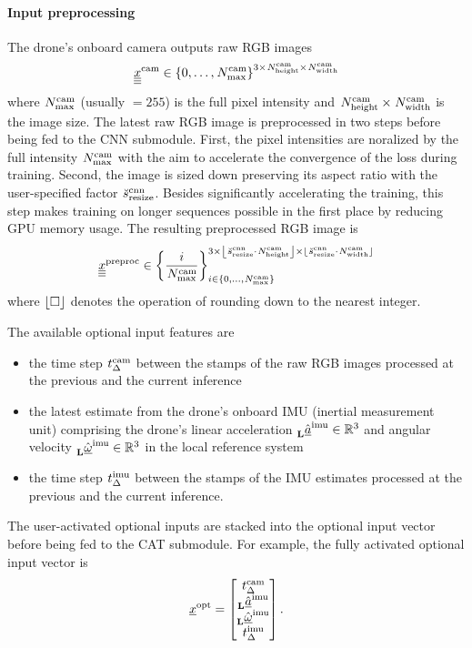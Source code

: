 \paragraph*{Input preprocessing} ${}$\\
The drone's onboard camera 
outputs raw RGB images
\begin{equation}
    {}_{}^{} {\underline{\underline{\underline x}}}^{\text{cam}}_{} \in \left\{ 0, \dots, {}_{}^{} {N}^{\text{cam}}_{\text{max}} \right\}^{
        3 \times {}_{}^{} {N}^{\text{cam}}_{\text{height}} \times {}_{}^{} {N}^{\text{cam}}_{\text{width}}}
\end{equation}
where 
${}_{}^{} {N}^{\text{cam}}_{\text{max}}$ (usually $= 255$) is the full pixel intensity 
and
${}_{}^{} {N}^{\text{cam}}_{\text{height}} \times {}_{}^{} {N}^{\text{cam}}_{\text{width}}$
is the image size.
The latest raw RGB image is preprocessed in two steps
before being fed to the CNN submodule.
First, the pixel intensities are noralized by the full intensity 
${}_{}^{} {N}^{\text{cam}}_{\text{max}}$ with the aim
to accelerate the convergence of the loss during training.
Second, the image is sized down 
preserving its aspect ratio
with the user-specified factor ${}_{}^{} \breve{s}^{\text{cnn}}_{\text{resize}}$.
Besides significantly accelerating the training,
this step makes training on longer sequences possible
in the first place by reducing GPU memory usage.
The resulting preprocessed RGB image is
\begin{equation} \label{eq:rgb_preproc}
    {}_{}^{} {\underline{\underline{\underline x}}}^{\text{preproc}}_{} \in \left\{ \frac{i}{{}_{}^{} {N}^{\text{cam}}_{\text{max}}} \right\}_{
        i \in \left\{ 0, \dots, {}_{}^{} {N}^{\text{cam}}_{\text{max}} \right\}
    }^{
        3 \times 
        \left\lfloor {}_{}^{} \breve{s}^{\text{cnn}}_{\text{resize}} \cdot {}_{}^{} {N}^{\text{cam}}_{\text{height}} \right\rfloor \times 
        \left\lfloor {}_{}^{} \breve{s}^{\text{cnn}}_{\text{resize}} \cdot {}_{}^{} {N}^{\text{cam}}_{\text{width}} \right\rfloor
    }
\end{equation} 
where $\left\lfloor \square \right\rfloor$ denotes the operation of rounding down to the nearest integer.



The available optional input features are
\begin{itemize}
    \item the time step
    ${}_{}^{} {t}^{\text{cam}}_{\Delta }$
    between the stamps of the raw RGB images processed
    at the previous and the current inference
    \item the latest estimate from the drone's onboard IMU
    (inertial measurement unit) 
    comprising the drone's linear acceleration
    ${}_{\textbf{L}}^{} \hat{\underline a}^{\text{imu}}_{} \in \mathbb{R}^3$
    and angular velocity
    ${}_{\textbf{L}}^{} \hat{\underline \omega}^{\text{imu}}_{} \in \mathbb{R}^3$
    in the local reference system
    \item the time step
    ${}_{}^{} {t}^{\text{imu}}_{\Delta }$
    between the stamps of the IMU estimates
    processed at the previous and the current inference.
\end{itemize}
The user-activated optional inputs are stacked into the optional input vector
before being fed to the CAT submodule.
For example, the fully activated optional input vector is
\begin{align}
    {}_{}^{} {\underline x}^{\text{opt}}_{} =
    \begin{bmatrix}
        {}_{}^{} {t}^{\text{cam}}_{\Delta } \\
        {}_{\textbf{L}}^{} \hat{\underline a}^{\text{imu}}_{} \\
        {}_{\textbf{L}}^{} \hat{\underline \omega}^{\text{imu}}_{} \\
        {}_{}^{} {t}^{\text{imu}}_{\Delta }
    \end{bmatrix}.
\end{align}








